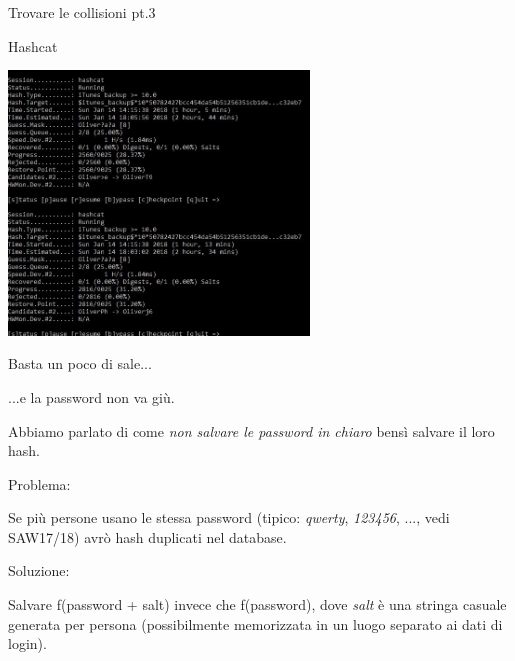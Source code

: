 \documentclass[handout, xcolor=dvipsnames,aspectratio=169]{beamer}
\begin{document}
\begin{frame}{Trovare le collisioni pt.3}

    Hashcat
    
    \medskip
    
    \centering\includegraphics[width=8cm]{img/hashcat}
    
\end{frame}
    
\begin{frame}{Basta un poco di sale...}
  
  ...e la password non va giù.
  
  \medskip

  \pause
  Abbiamo parlato di come \textit{non salvare le password in chiaro} bensì salvare il loro hash.
  
  \medskip
  \pause

  Problema: 
  
  Se più persone usano le stessa password (tipico: \textit{qwerty}, \textit{123456}, ..., vedi SAW17/18) avrò hash duplicati nel database.
  
  \medskip
  \pause
  Soluzione: 
  
  Salvare f(password + salt) invece che f(password), dove \textit{salt} è una stringa casuale generata per persona (possibilmente memorizzata in un luogo separato ai dati di login).
  
\end{frame}
\end{document}

